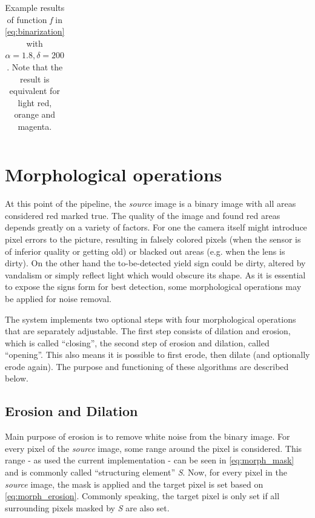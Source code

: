 \documentclass{report}
\begin{document}
\begin{table}
\begin{tabular}{c r r r r r}
  \end{tabular}
  \caption{Example results of function \textit{f} in
    \ref{eq:binarization} with \( \alpha=1.8, \delta=200 \). Note that
    the result is equivalent for light red, orange and magenta.}
  \label{table:binarization}
\end{table}

{}


\section{Morphological operations}

At this point of the pipeline, the \textit{source} image is a binary
image with all areas considered red marked true. The quality of the
image and found red areas depends greatly on a variety of factors. For
one the camera itself might introduce pixel errors to the picture,
resulting in falsely colored pixels (when the sensor is of inferior
quality or getting old) or blacked out areas (e.g. when the lens is
dirty). On the other hand the to-be-detected yield sign could be
dirty, altered by vandalism or simply reflect light which would
obscure its shape. As it is essential to expose the signs form for
best detection, some morphological operations may be applied for noise
removal.

The system implements two optional steps with four morphological
operations that are separately adjustable. The first step consists of
dilation and erosion, which is called ``closing'', the second step of
erosion and dilation, called ``opening''. This also means it is
possible to first erode, then dilate (and optionally erode again). The
purpose and functioning of these algorithms are described below.

\subsection{Erosion and Dilation}

Main purpose of erosion is to remove white noise from the binary
image. For every pixel of the \textit{source} image, some range around
the pixel is considered. This range - as used the current
implementation - can be seen in \ref{eq:morph_mask} and is commonly
called ``structuring element'' \textit{S}. Now, for every pixel in the
\textit{source} image, the mask is applied and the target pixel is set
based on \ref{eq:morph_erosion}. Commonly speaking, the target pixel
is only set if all surrounding pixels masked by \textit{S} are also
set.
\end{document}
